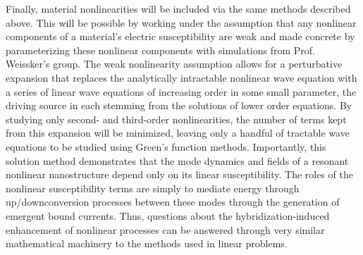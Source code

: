 \documentclass[11pt,a4paper]{article}
\begin{document}
Finally, material nonlinearities will be included via the same methods described above. This will be possible by working under the assumption that any nonlinear components of a material's electric susceptibility are weak and made concrete by parameterizing these nonlinear components with simulations from Prof. Weissker's group. The weak nonlinearity assumption allows for a perturbative expansion that replaces the analytically intractable nonlinear wave equation with a series of linear wave equations of increasing order in some small parameter, the driving source in each stemming from the solutions of lower order equations. By studying only second- and third-order nonlinearities, the number of terms kept from this expansion will be minimized, leaving only a handful of tractable wave equations to be studied using Green's function methods. Importantly, this solution method demonstrates that the mode dynamics and fields of a resonant nonlinear nanostructure depend only on its linear susceptibility. The roles of the nonlinear susceptibility terms are simply to mediate energy through up/downconversion processes between these modes through the generation of emergent bound currents. Thus, questions about the hybridization-induced enhancement of nonlinear processes can be answered through very similar mathematical machinery to the methods used in linear problems.








\end{document}
